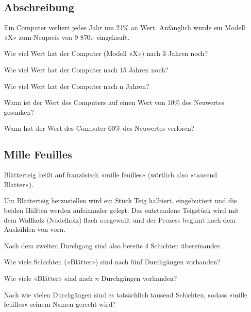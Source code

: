 \subsection{Abschreibung}
Ein Computer verliert jedes Jahr um 21\% an Wert. Anfänglich wurde ein Modell «X»
zum Neupreis von 9 870.- eingekauft.

\begin{bbwAufgabenBlock}
\item  Wie viel Wert hat der Computer (Modell «X») nach 3 Jahren
noch?  
\item Wie viel Wert hat der Computer nach 15 Jahren noch?  
\item Wie viel Wert hat der Computer nach n Jahren?   \noTRAINER{\seitenUmbruchImAufgabenteil{}}
\item Wann ist der Wert des Computers auf einen Wert von 10\% des
Neuwertes gesunken?  
\item Wann hat der Wert des Computer 60\% des Neuwertes
verloren?  
\end{bbwAufgabenBlock}

\platzFuerBerechnungenBisEndeSeite{}
\subsection{Mille Feuilles}
Blätterteig heißt auf französisch «mille feuilles» (wörtlich also
«tausend Blätter»).

Um Blätterteig herzustellen wird ein Stück Teig halbiert, eingebuttert
und die beiden Hälften werden aufeinander gelegt. Das entstandene
Teigstück wird mit dem Wallholz (Nudelholz) flach ausgewallt und der
Prozess beginnt nach dem Auskühlen von vorn.

Nach dem zweiten Durchgang sind also bereits 4 Schichten übereinander.

\begin{bbwAufgabenBlock}
\item Wie viele Schichten («Blätter») sind nach fünf Durchgängen
vorhanden?  

\item Wie viele «Blätter» sind nach $n$ Durchgängen
vorhanden?  

\item Nach wie vielen Durchgängen sind es tatsächlich tausend
Schichten, sodass «mille feuilles» seinem Namen gerecht
wird? 

\end{bbwAufgabenBlock}

